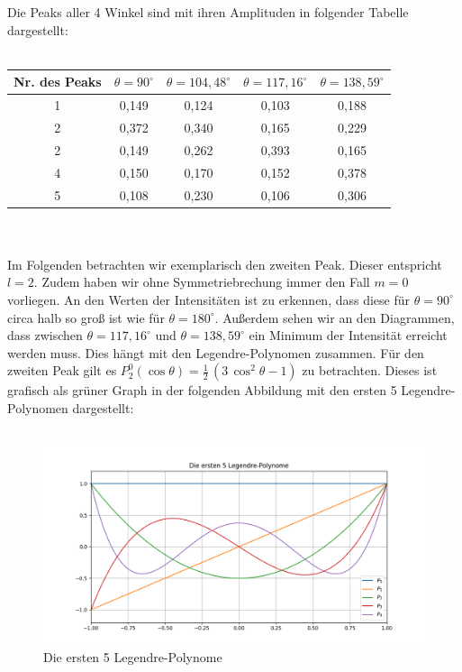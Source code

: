 \documentclass[german,  %
parskip=full,  %
]{scrartcl}
\begin{document}
Die Peaks aller 4 Winkel sind mit ihren Amplituden in folgender Tabelle dargestellt: \\\\
\begin{table}[h!]\centering
\begin{tabular}{|c|c|c|c|c|} \hline
Nr. des Peaks & $\theta=90^{\circ}$ & $\theta=104,48^{\circ}$ & $\theta=117,16^{\circ}$ & $\theta=138,59^{\circ}$ \\ \hline
1 	& 0,149 & 0,124 & 0,103 & 0,188 	\\ \hline
2 	&  0,372 & 0,340 & 0,165 & 0,229	\\ \hline
2  	& 0,149 & 0,262 & 0,393 & 0,165 	 \\ \hline
4	& 0,150 	& 0,170 & 0,152 & 0,378  	 \\ \hline
5	& 0,108 &   0,230 & 0,106 & 0,306	 \\ \hline
\end{tabular}
\end{table} \\\\
Im Folgenden betrachten wir exemplarisch den zweiten Peak. Dieser entspricht $l=2$. Zudem haben wir ohne Symmetriebrechung immer den Fall $m=0$ vorliegen. An den Werten der Intensitäten ist zu erkennen, dass diese für $\theta = 90^{\circ}$ circa halb so groß ist wie für $\theta=180^{\circ}$. Außerdem sehen wir an den Diagrammen, dass zwischen $\theta=117,16^{\circ}$ und $\theta=138,59^{\circ}$ ein Minimum der Intensität erreicht werden muss. Dies hängt mit den Legendre-Polynomen zusammen. Für den zweiten Peak gilt es $P^{0}_{2}(\cos \theta)=\frac{1}{2}\,(3\,\cos^2\theta-1)$ zu betrachten. Dieses ist grafisch als grüner Graph in der folgenden Abbildung mit den ersten 5 Legendre-Polynomen dargestellt: \\\\
\begin{figure}[h!]
\centering
\includegraphics[width=\textwidth]{Legendre_Polynome.png}
\caption{Die ersten 5 Legendre-Polynome}
\end{figure} \\\\
\end{document}
